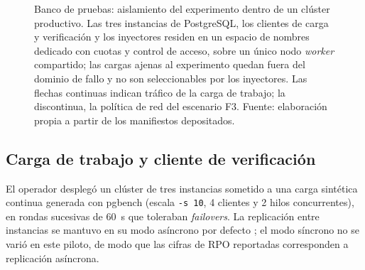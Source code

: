 \begin{figure}[t]
\caption{Banco de pruebas: aislamiento del experimento dentro de un clúster productivo. Las tres
instancias de PostgreSQL, los clientes de carga y verificación y los inyectores residen en un
espacio de nombres dedicado con cuotas y control de acceso, sobre un único nodo \textit{worker}
compartido; las cargas ajenas al experimento quedan fuera del dominio de fallo y no son
seleccionables por los inyectores. Las flechas continuas indican tráfico de la carga de trabajo;
la discontinua, la política de red del escenario F3. Fuente: elaboración propia a partir de los
manifiestos depositados.}
\label{fig:testbed}
\end{figure}


\subsection{Carga de trabajo y cliente de verificación}\label{sec:carga}
El operador desplegó un clúster de tres instancias sometido a una carga sintética continua generada con pgbench (escala \texttt{-s 10}, 4 clientes y 2 hilos concurrentes), en rondas sucesivas de 60~s que toleraban \textit{failovers}. La replicación entre instancias se mantuvo en su modo asíncrono por defecto \citep{postgresql2024}; el modo síncrono no se varió en este piloto, de modo que las cifras de RPO reportadas corresponden a replicación asíncrona.

